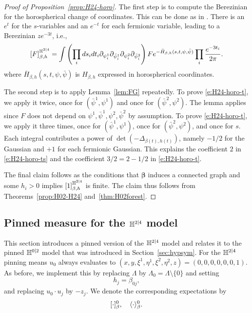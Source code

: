 \documentclass[11pt]{amsart}
\numberwithin{equation}{section}
\numberwithin{theorem}{section}
\newcommand{\ob}[1]{\left(#1\right )} %
\newcommand{\cb}[1]{\left[#1\right ]} %
\newcommand{\V}[1]{\boldsymbol{#1}}
\begin{document}
\begin{proof}[Proof of Proposition~\ref{prop:H24-horo}]
  The first step is to compute the Berezinian for the horospherical
  change of coordinates. This can be done as in \cite[Appendix
  A]{MR4021254}.  There is an $e^{t}$ for the $s$-variables and an
  $e^{-t}$ for each fermionic variable, leading to a Berezinian
  $z e^{-3t}$, i.e.,
  \begin{equation}
    \cb{F}_{\beta,h}^{\HH^{2|4}} = \int
    \ob{\prod_{i}ds_{i} dt_{i}\partial_{\psi_{i}^{1}}\partial_{\bar\psi^{1}_{i}}
    \partial_{\psi^{2}_{i}}\partial_{\bar\psi^{2}_{i}}} 
  Fe^{-\bar H_{\beta,h}(s,t,\psi,\bar\psi)} \prod_{i}\frac{e^{-3t_{i}}}{2\pi}.
  \end{equation}
  where $\bar H_{\beta,h}(s,t,\psi,\bar\psi)$ is $H_{\beta,h}$
  expressed in horospherical coordinates.

  The second step is to apply Lemma~\ref{lem:FG} repeatedly.
  To prove \eqref{e:H24-horo-t}, we apply it twice,
  once for $(\bar\psi^{1},\psi^{1})$ and once for
  $(\bar\psi^{2},\psi^{2})$. The lemma applies since $F$ does
  not depend on $\psi^{1},\bar\psi^{1},\psi^{2},\bar\psi^{2}$ by assumption.
  To prove \eqref{e:H24-horo-t}, we apply it three times,
  once for $(\bar\psi^{1},\psi^{1})$, once for $(\bar\psi^{2},\psi^{2})$,
  and once for $s$.
  Each integral contributes a power of $\det (-\Delta_{\beta(t),h(t)})$,
  namely $-1/2$ for the Gaussian and $+1$ for each fermionic Gaussian.
  This explains the coefficient $2$ in \eqref{e:H24-horo-ts} and the
  coefficient $3/2=2-1/2$ in \eqref{e:H24-horo-t}. 

  The final claim follows as the conditions that $\V{\beta}$
  induces a connected graph and some $h_{i}>0$ implies
  $\cb{1}_{\beta,h}^{\HH^{2|4}}$ is finite. The claim thus follows from
  Theorems~\ref{prop:H02-H24} and~\ref{thm:H02forest}.
\end{proof}


\subsection{Pinned measure for the $\mathbb{H}^{2|4}$ model}
\label{sec:pinH24}

This section introduces a pinned version of the $\mathbb{H}^{2|4}$ model and
relates it to the pinned $\mathbb{H}^{0|2}$ model that was introduced in
Section~\ref{sec:hypsym}.  For the $\mathbb{H}^{2|4}$ pinning means $u_{0}$
always evaluates to $(x,y,\xi^{1},\eta^{1},\xi^{2},\eta^{2},z) = (0,0,0,0,0,0,1)$.
As before, we implement this by replacing $\Lambda$ by
$\Lambda_0 = \Lambda \setminus \{0\}$ and setting
\begin{equation} \label{e:h-pinned}
  h_j = \beta_{0j},
\end{equation}
and replacing $u_0 \cdot u_j$ by $-z_j$.
We denote the corresponding expectations by
\begin{equation} \label{e:exp-pinn-24}
  [\cdot]_\beta^0, \quad \langle \cdot \rangle_\beta^0.
\end{equation}
\end{document}
